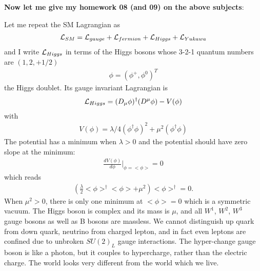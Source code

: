 \documentclass[12pt]{article}
\begin{document}
{\bf Now let me give my homework 08 (and 09) on the above subjects}:

  Let me repeat the SM Lagrangian as
  \begin{eqnarray}
    {\cal L}_{SM} = {\cal L}_{gauge} + {\cal L}_{fermion} + {\cal L}_{Higgs} + {\cal L}_{Yukawa} \label{eq.8LSM}
  \end{eqnarray}
   and I write ${\cal L}_{Higgs}$ in terms of the Higgs bosons whose
  3-2-1 quantum numbers are $(1,2,+1/2)$
  \begin{eqnarray}
    \phi = ( \phi^+, \phi^0 )^T
  \end{eqnarray}
  the Higgs doublet. Its gauge invariant Lagrangian is
  \begin{eqnarray}
    {\cal L}_{Higgs} = (D_\mu \phi)^\dagger (D^\mu \phi) - V(\phi)
  \end{eqnarray}
   with
  \begin{eqnarray}
    V(\phi) = \lambda/4 (\phi^\dagger \phi)^2
                  + \mu^2 (\phi^\dagger \phi)
  \end{eqnarray}
  The potential has a minimum when $\lambda > 0$
  and the potential should have zero slope at the minimum:
  \begin{eqnarray}
    \frac{dV(\phi)}{d\phi}|_{\phi=<\phi>}=0
  \end{eqnarray}
  which reads
  \begin{eqnarray}
    (\frac{\lambda}{2} <\phi>^\dagger <\phi> + \mu^2) <\phi>^\dagger = 0. \label{eq.8pde}
  \end{eqnarray}
  When $\mu^2 > 0$, there is only one minimum at
  $<\phi> = 0$
  which is a symmetric vacuum. The Higgs boson is complex and
  its mass is $\mu$, and all $W^1$, $W^2$, $W^3$ gauge bosons as well as
  B bosons are massless.  We cannot distinguish up quark from
  down quark, neutrino from charged lepton, and in fact even
  leptons are confined due to unbroken $SU(2)_L$ gauge interactions.
  The hyper-change gauge boson is like a photon, but it couples to
  hypercharge, rather than the electric charge.  The world looks
  very different from the world which we live.
\end{document}
